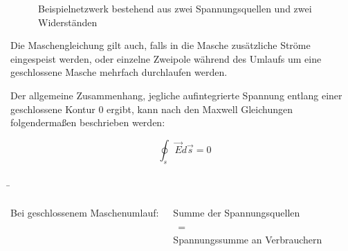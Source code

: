 \begin{frame}
{	

	

	



	 \begin{figure}[h!]
		\begin{center}
			
		
	

		\end{center}
		\caption{Beispielnetzwerk bestehend aus zwei Spannungsquellen und zwei Widerständen}
		\label{fig:masche}
	 \end{figure}

	 Die Maschengleichung gilt auch, falls in die Masche zusätzliche Ströme eingespeist werden,
	  oder einzelne Zweipole während des Umlaufs um eine geschlossene Masche mehrfach durchlaufen werden.

	Der allgemeine Zusammenhang, jegliche aufintegrierte Spannung entlang einer geschlossene Kontur 0 ergibt, kann
	 nach den Maxwell Gleichungen folgendermaßen beschrieben werden: 

	\begin{equation}
		\oint_{s} \vec{E} d\vec{s} = 0
	\end{equation}



	}


	 \b{
    \begin{columns}
 
        \vspace{-70pt}

		Bei geschlossenem Maschenumlauf:
		\vspace{-5pt}
		\begin{Merksatz}{}
		
			\begin{center}

			
			Summe der Spannungsquellen\\
			\quad \quad\ \quad =\\
			Spannungssumme an Verbrauchern


\end{center}
\end{Merksatz}
\end{columns}}
\end{frame}
